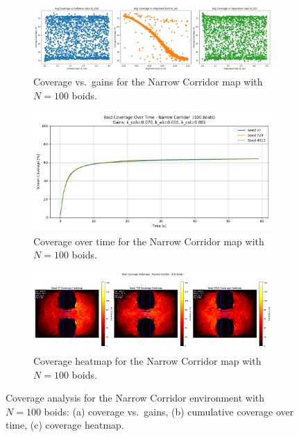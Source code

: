 \documentclass[12pt]{article}
\begin{document}
\begin{figure}[h!]
  \centering
  \begin{subfigure}[b]{0.32\linewidth}
    \includegraphics[width=\linewidth]{cov_vs_gains/narrow_100.png}
    \caption{Coverage vs.~gains for the Narrow Corridor map with $N=100$ boids.}
    \label{fig:app:narrow100_gains}
  \end{subfigure}\hfill
  \begin{subfigure}[b]{0.32\linewidth}
    \includegraphics[width=\linewidth]{optimal_cov_vs_time/narrow_100.png}
    \caption{Coverage over time for the Narrow Corridor map with $N=100$ boids.}
    \label{fig:app:narrow100_time}
  \end{subfigure}\hfill
  \begin{subfigure}[b]{0.32\linewidth}
    \includegraphics[width=\linewidth]{heatmaps/narrow_100.png}
    \caption{Coverage heatmap for the Narrow Corridor map with $N=100$ boids.}
    \label{fig:app:narrow100_heat}
  \end{subfigure}
  \caption{Coverage analysis for the Narrow Corridor environment with $N=100$ boids: (a) coverage vs.~gains, (b) cumulative coverage over time, (c) coverage heatmap.}
  \label{fig:app:narrow100}
\end{figure}
\end{document}
